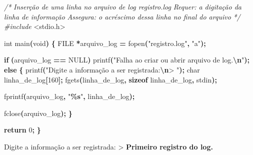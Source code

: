 \documentclass[
  11pt,
  a4paper,
]{scrbook}
\newenvironment{Shaded}{\begin{snugshade}}{\end{snugshade}}
\newcommand{\CommentTok}[1]{\textcolor[rgb]{0.56,0.35,0.01}{\textit{#1}}}
\newcommand{\ControlFlowTok}[1]{\textcolor[rgb]{0.13,0.29,0.53}{\textbf{#1}}}
\newcommand{\DataTypeTok}[1]{\textcolor[rgb]{0.13,0.29,0.53}{#1}}
\newcommand{\DecValTok}[1]{\textcolor[rgb]{0.00,0.00,0.81}{#1}}
\newcommand{\ImportTok}[1]{#1}
\newcommand{\KeywordTok}[1]{\textcolor[rgb]{0.13,0.29,0.53}{\textbf{#1}}}
\newcommand{\NormalTok}[1]{#1}
\newcommand{\OperatorTok}[1]{\textcolor[rgb]{0.81,0.36,0.00}{\textbf{#1}}}
\newcommand{\PreprocessorTok}[1]{\textcolor[rgb]{0.56,0.35,0.01}{\textit{#1}}}
\newcommand{\SpecialCharTok}[1]{\textcolor[rgb]{0.81,0.36,0.00}{\textbf{#1}}}
\newcommand{\StringTok}[1]{\textcolor[rgb]{0.31,0.60,0.02}{#1}}
\begin{document}
\begin{Shaded}
\begin{Highlighting}[]
\CommentTok{/*}
\CommentTok{Inserção de uma linha no arquivo de log \textquotesingle{}registro.log\textquotesingle{}}
\CommentTok{Requer: a digitação da linha de informação}
\CommentTok{Assegura: o acréscimo dessa linha no final do arquivo}
\CommentTok{*/}
\PreprocessorTok{\#include }\ImportTok{\textless{}stdio.h\textgreater{}}

\DataTypeTok{int}\NormalTok{ main}\OperatorTok{(}\DataTypeTok{void}\OperatorTok{)} \OperatorTok{\{}
    \DataTypeTok{FILE} \OperatorTok{*}\NormalTok{arquivo\_log }\OperatorTok{=}\NormalTok{ fopen}\OperatorTok{(}\StringTok{"registro.log"}\OperatorTok{,} \StringTok{"a"}\OperatorTok{);}

    \ControlFlowTok{if} \OperatorTok{(}\NormalTok{arquivo\_log }\OperatorTok{==}\NormalTok{ NULL}\OperatorTok{)}
\NormalTok{        printf}\OperatorTok{(}\StringTok{"Falha ao criar ou abrir arquivo de log.}\SpecialCharTok{\textbackslash{}n}\StringTok{"}\OperatorTok{);}
    \ControlFlowTok{else} \OperatorTok{\{}
\NormalTok{        printf}\OperatorTok{(}\StringTok{"Digite a informação a ser registrada:}\SpecialCharTok{\textbackslash{}n}\StringTok{\textgreater{} "}\OperatorTok{);}
        \DataTypeTok{char}\NormalTok{ linha\_de\_log}\OperatorTok{[}\DecValTok{160}\OperatorTok{];}
\NormalTok{        fgets}\OperatorTok{(}\NormalTok{linha\_de\_log}\OperatorTok{,} \KeywordTok{sizeof}\NormalTok{ linha\_de\_log}\OperatorTok{,}\NormalTok{ stdin}\OperatorTok{);}

\NormalTok{        fprintf}\OperatorTok{(}\NormalTok{arquivo\_log}\OperatorTok{,} \StringTok{"}\SpecialCharTok{\%s}\StringTok{"}\OperatorTok{,}\NormalTok{ linha\_de\_log}\OperatorTok{);}

\NormalTok{        fclose}\OperatorTok{(}\NormalTok{arquivo\_log}\OperatorTok{);}
    \OperatorTok{\}}

    \ControlFlowTok{return} \DecValTok{0}\OperatorTok{;}
\OperatorTok{\}}
\end{Highlighting}
\end{Shaded}

\begin{Shaded}
\begin{Highlighting}[]
\NormalTok{Digite a informação a ser registrada:}
\NormalTok{\textgreater{} }\KeywordTok{ Primeiro registro do log. }
\end{Highlighting}
\end{Shaded}
\end{document}
